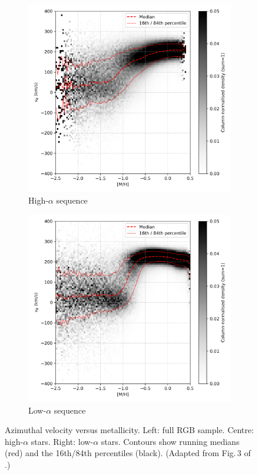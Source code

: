 \documentclass[a4paper,12pt]{article}
\begin{document}
\begin{figure}[H]
\begin{subfigure}[b]{0.32\textwidth}
    \includegraphics[width=\textwidth]{../figures/vis_mh_vphi_high_alpha.png}
    \caption{High-$\alpha$ sequence}
  \end{subfigure}\hfill
  \begin{subfigure}[b]{0.32\textwidth}
    \includegraphics[width=\textwidth]{../figures/vis_mh_vphi_low_alpha.png}
    \caption{Low-$\alpha$ sequence}
  \end{subfigure}

  \caption{Azimuthal velocity versus metallicity.  
           Left: full RGB sample.  
           Centre: high-$\alpha$ stars.  
           Right: low-$\alpha$ stars.  
           Contours show running medians (red) and the 16th/84th percentiles (black).  
           (Adapted from Fig.\,3 of \citealt{Vis2024}.)}
  \label{fig:mh_vphi_alpha}
\end{figure}
\end{document}
